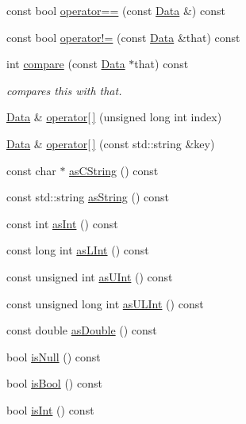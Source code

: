 \begin{DoxyCompactItemize}
\item 
const bool \hyperlink{classklop_1_1Data_ad28491b8ae14f330f0984a6858784282}{operator==} (const \hyperlink{classklop_1_1Data}{Data} \&) const 
\item 
const bool \hyperlink{classklop_1_1Data_a7ca19b70eca4aedd3c9f0fdebab8fd86}{operator!=} (const \hyperlink{classklop_1_1Data}{Data} \&that) const 
\item 
int \hyperlink{classklop_1_1Data_a48c0c9ec00a5e80be6133e3719a98f69}{compare} (const \hyperlink{classklop_1_1Data}{Data} $\ast$that) const 
\begin{DoxyCompactList}\small\item\em compares this with that. \item\end{DoxyCompactList}\item 
\hyperlink{classklop_1_1Data}{Data} \& \hyperlink{classklop_1_1Data_ab1dcb73c03a022536bea81909efd38a0}{operator\mbox{[}$\,$\mbox{]}} (unsigned long int index)
\item 
\hyperlink{classklop_1_1Data}{Data} \& \hyperlink{classklop_1_1Data_ad8528ee8db5d11a73c9217f111336431}{operator\mbox{[}$\,$\mbox{]}} (const std::string \&key)
\item 
const char $\ast$ \hyperlink{classklop_1_1Data_a80fbe109ee89d124f0e6e54cffaf3cec}{asCString} () const 
\item 
const std::string \hyperlink{classklop_1_1Data_a6c7a640bb2dff6835f191da35c476f8b}{asString} () const 
\item 
const int \hyperlink{classklop_1_1Data_a5069fdc536607f5c03e5c1ec4783adb5}{asInt} () const 
\item 
const long int \hyperlink{classklop_1_1Data_a6b4f0a7bd2944614906c2281272ee440}{asLInt} () const 
\item 
const unsigned int \hyperlink{classklop_1_1Data_abfea4bddc554b33099f4f47885531ceb}{asUInt} () const 
\item 
const unsigned long int \hyperlink{classklop_1_1Data_a40660fb1172e6ced42a434fdc37d8a18}{asULInt} () const 
\item 
const double \hyperlink{classklop_1_1Data_afd3558ce5f444beea44e33c2b50d87d0}{asDouble} () const 
\item 
bool \hyperlink{classklop_1_1Data_a6a16cf18018df26abaaeabd78e2929fa}{isNull} () const 
\item 
bool \hyperlink{classklop_1_1Data_affe7adc36ab32926e1446bc116054de8}{isBool} () const 
\item 
bool \hyperlink{classklop_1_1Data_a7f1f9ae1d7c12e3cc41cdd4c493c2086}{isInt} () const 

\end{DoxyCompactItemize}
